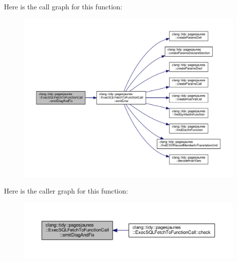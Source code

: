 Here is the call graph for this function\+:
\nopagebreak
\begin{figure}[H]
\begin{center}
\leavevmode
\includegraphics[width=350pt]{classclang_1_1tidy_1_1pagesjaunes_1_1_exec_s_q_l_fetch_to_function_call_a4c78d8c38616b4f3cf6f4294f2a22953_cgraph}
\end{center}
\end{figure}
Here is the caller graph for this function\+:
\nopagebreak
\begin{figure}[H]
\begin{center}
\leavevmode
\includegraphics[width=350pt]{classclang_1_1tidy_1_1pagesjaunes_1_1_exec_s_q_l_fetch_to_function_call_a4c78d8c38616b4f3cf6f4294f2a22953_icgraph}
\end{center}
\end{figure}
\mbox{\label{classclang_1_1tidy_1_1pagesjaunes_1_1_exec_s_q_l_fetch_to_function_call_a28043b514dd024dde394972563d78800}} 
